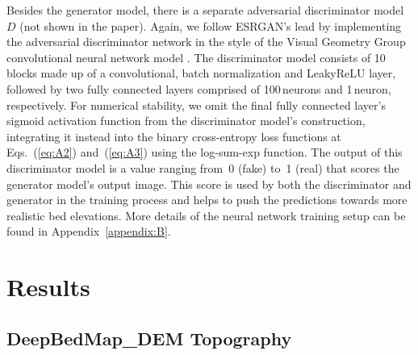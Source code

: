 Besides the generator model, there is a separate adversarial discriminator model $D$ (not shown in the paper).
Again, we follow ESRGAN's \citep{WangESRGANEnhancedSuperResolution2019} lead by implementing the adversarial discriminator network in the style of the Visual Geometry Group convolutional neural network model \citep[VGG;][]{SimonyanVeryDeepConvolutional2014}.
The discriminator model consists of 10 blocks made up of a convolutional, batch normalization \citep{IoffeBatchNormalizationAccelerating2015} and LeakyReLU \citep{MaasRectifiernonlinearitiesimprove2013} layer, followed by two fully connected layers comprised of 100\,\unit{neurons} and 1\,\unit{neuron}, respectively.
For numerical stability, we omit the final fully connected layer's sigmoid activation function from the discriminator model's construction, integrating it instead into the binary cross-entropy loss functions at Eqs.~(\ref{eq:A2}) and~(\ref{eq:A3}) using the log-sum-exp function.
The output of this discriminator model is a value ranging from~0 (fake) to~1 (real) that scores the generator model's output image.
This score is used by both the discriminator and generator in the training process and helps to push the predictions towards more realistic bed elevations.
More details of the neural network training setup can be found in Appendix~\ref{appendix:B}.


\section{Results}

\subsection{DeepBedMap\_DEM Topography} \label{section:deepbedmapdemtopography}

